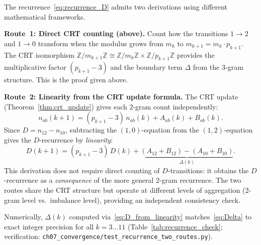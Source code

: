 \documentclass[12pt,a4paper]{article}
\begin{document}
\begin{remark}
\label{rem:recurrence_routes}
The recurrence~\eqref{eq:recurrence_D} admits two derivations using
different mathematical frameworks.

\textbf{Route~1: Direct CRT counting (above).}
Count how the transitions $1 \to 2$ and $1 \to 0$ transform when
the modulus grows from $m_k$ to $m_{k+1} = m_k \cdot p_{k+1}$.
The CRT isomorphism $\mathbb{Z}/m_{k+1}\mathbb{Z} \cong
\mathbb{Z}/m_k\mathbb{Z} \times \mathbb{Z}/p_{k+1}\mathbb{Z}$
provides the multiplicative factor $(p_{k+1} - 3)$ and the boundary
term $\Delta$ from the 3-gram structure. This is the proof given above.

\textbf{Route~2: Linearity from the CRT update formula.}
The CRT update (Theorem~\ref{thm:crt_update}) gives each 2-gram count
independently:
\[
  n_{ab}(k+1) = (p_{k+1} - 3)\,n_{ab}(k) + A_{ab}(k) + B_{ab}(k).
\]
Since $D = n_{12} - n_{10}$, subtracting the $(1,0)$-equation from
the $(1,2)$-equation gives the $D$-recurrence by \emph{linearity}:
\begin{equation}
  D(k+1) = (p_{k+1} - 3)\,D(k) + \underbrace{(A_{12} + B_{12}) - (A_{10} + B_{10})}_{\Delta(k)}.
  \label{eq:D_from_linearity}
\end{equation}
This derivation does not require direct counting of $D$-transitions:
it obtains the $D$-recurrence as a \emph{consequence} of the more general
2-gram recurrence. The two routes share the CRT structure but operate
at different levels of aggregation (2-gram level vs.\ imbalance level),
providing an independent consistency check.

Numerically, $\Delta(k)$ computed via~\eqref{eq:D_from_linearity}
matches~\eqref{eq:Delta} to exact integer precision for all
$k = 3\ldots 11$ (Table~\ref{tab:recurrence_check}; verification:
\texttt{ch07\_convergence/test\_recurrence\_two\_routes.py}).
\end{remark}
\end{document}

